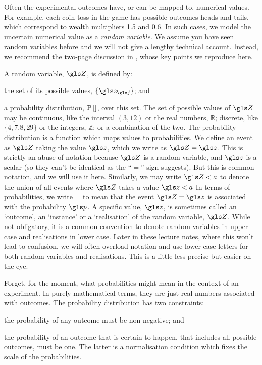 Often the experimental outcomes have, or can be mapped to, numerical values. For example, each coin toss in the game has possible outcomes heads and tails, which correspond to wealth multipliers 1.5 and 0.6. In such cases, we model the uncertain numerical value as a \textit{random variable}. We assume you have seen random variables before and we will not give a lengthy technical account. Instead, we recommend the two-page discussion in \cite[p.~2]{vanKampen1992}, whose key points we reproduce here.

A random variable, $\Z$, is defined by:
\bi
\item the set of its possible values, $\{\z_\gj\}$; and
\item a probability distribution, $\mathrm{P}\left[\right]$, over this set.
\ei
The set of possible values of $\Z$ may be continuous, like the interval $(3,12)$ or the real numbers, 
$\mathbb{R}$; discrete, like $\{4, 7.8, 29\}$ or the integers, $\mathbb{Z}$; or a combination 
of the two. The probability distribution is a function which maps values to probabilities. We define an 
event as $\Z$ taking the value $\z$, which we write as $\Z=\z$. This is strictly an abuse
of notation because $\Z$ is a random variable, and $\z$ is a scalar (so they can't be identical as 
the ``$=$'' sign suggests). But this is common notation, and we will use it here. Similarly, we may write $\Z<a$
to denote the union of all events where $\Z$ takes a value $\z<a$ \etc
In terms of probabilities, we write
\be
\prob{\Z=\z}=\p
\ee
to mean that the event $\Z=\z$ is associated with the probability $\p$. A specific value, $\z$, 
is sometimes called an `outcome', an `instance' or a `realisation' of the random variable, $\Z$. 
While not obligatory, it is a common convention to denote random variables in upper case and 
realisations in lower case. Later in these lecture notes, where this won't lead to confusion, we will 
often overload notation and use lower case letters for both random variables and realisations. 
This is a little less precise but easier on the eye. 

Forget, for the moment, what probabilities might mean in the context of an experiment. In purely 
mathematical terms, they are just real numbers associated with outcomes. The probability 
distribution has two constraints:
\bi
\item the probability of any outcome must be non-negative; and
\item the probability of an outcome that is certain to happen, \ie that includes all possible outcomes, must be one.
\ei
The latter is a normalisation condition which fixes the scale of the probabilities.


